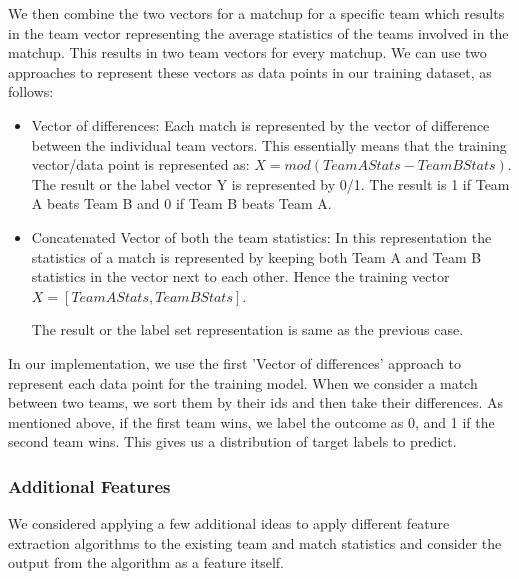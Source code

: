 \documentclass{article}
\begin{document}
    	\begin{multicols}{2} 
	
	We then combine the two vectors for a matchup for a specific team which results in the team vector representing the average statistics of the teams involved in the matchup. This results in two team vectors for every matchup. We can use two approaches to represent these vectors as data points in our training dataset, as follows:
\begin{itemize}	
\item
	Vector of differences: Each match is represented by the vector of difference between the individual team vectors. This essentially means that the training vector/data point is represented as:
	\newline \newline 
	$X  =  mod(Team A Stats - Team B Stats)$. 
	\newline \newline 
	The result or the label vector Y is represented by 0/1. The result is 1 if Team A beats Team B 
and 0 if Team B beats Team A. 	
	
	\item 
	Concatenated Vector of both the team statistics: In this representation the statistics of a match is represented by keeping both Team A and Team B statistics in the vector next to each other. Hence the training vector 
	\newline \newline 
	$X  =  [Team A Stats, Team B Stats]$. 
	\newline 

	The result or the label set representation is same as the previous case.
	\end{itemize}
	
	In our implementation, we use the first 'Vector of differences' approach to represent each data point for the training model. When we consider a match between two teams, we sort them by their ids and then take their differences. As mentioned above, if the first team wins, we label the outcome as 0, and 1 if the second team wins. This gives us a distribution of target labels to predict.
	
	\subsubsection{Additional Features}
	We considered applying a few additional ideas to apply different feature extraction algorithms to the existing team and match statistics and consider the output from the algorithm as a feature itself. 
	

\end{multicols}
\end{document}
